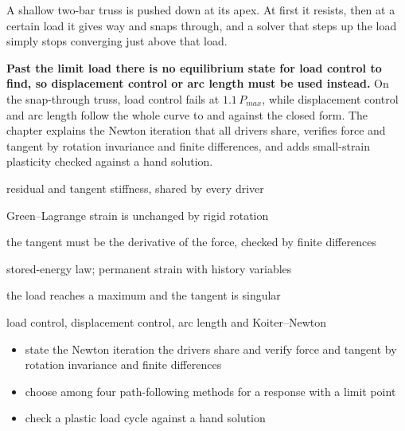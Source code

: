 \newpage\thispagestyle{hl}
\begin{hlquote}A shallow two-bar truss is pushed down at its apex. At first it resists, then at a certain load it gives way and snaps through, and a solver that steps up the load simply stops converging just above that load.\end{hlquote}
\vspace{8pt}\begin{hlsum}\textbf{Past the limit load there is no equilibrium state for load control to find, so displacement control or arc length must be used instead.} On the snap-through truss, load control fails at $1.1\,P_{max}$, while displacement control and arc length follow the whole curve to \cnlTrussErrDC{} and \cnlTrussErrAL{} against the closed form. The chapter explains the Newton iteration that all drivers share, verifies force and tangent by rotation invariance and finite differences, and adds small-strain plasticity checked against a hand solution.\end{hlsum}
\begin{description}\setlength\itemsep{5pt}\setlength\parsep{0pt}\renewcommand{\descriptionlabel}[1]{\hspace{\labelsep}\sffamily\bfseries\color{hlnavy}#1}
\item[Newton iteration] residual and tangent stiffness, shared by every driver
\item[Total-Lagrangian kinematics] Green--Lagrange strain is unchanged by rigid rotation
\item[Tangent consistency] the tangent must be the derivative of the force, checked by finite differences
\item[Hyperelasticity, $J_2$ plasticity] stored-energy law; permanent strain with history variables
\item[Limit point] the load reaches a maximum and the tangent is singular
\item[Path following] load control, displacement control, arc length and Koiter--Newton
\end{description}
\begin{itemize}\setlength\itemsep{3pt}
\item state the Newton iteration the drivers share and verify force and tangent by rotation invariance and finite differences
\item choose among four path-following methods for a response with a limit point
\item check a plastic load cycle against a hand solution
\end{itemize}
